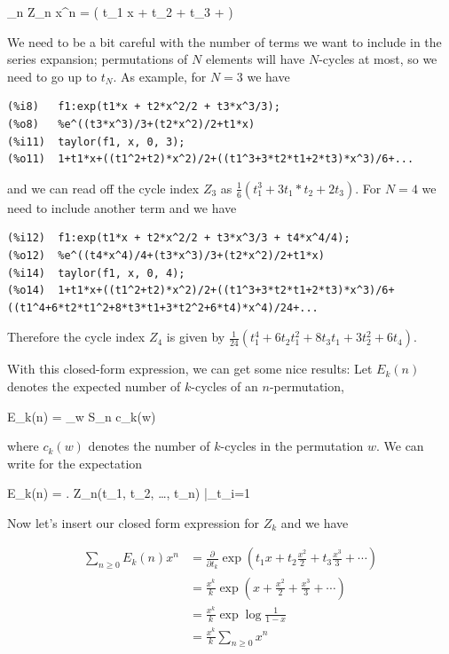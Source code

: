 \bee
\sum_n Z_n x^n = \exp \left( t_1 x + t_2  + t_3  + \cdots \right)
\eee

We need to be a bit careful with the number of terms we want to include in the series expansion; permutations of $N$ elements will have $N$-cycles at most, so we need to go up to $t_N$. As example, for $N=3$ we have

\begin{verbatim}
(%i8)	f1:exp(t1*x + t2*x^2/2 + t3*x^3/3);
(%o8)	%e^((t3*x^3)/3+(t2*x^2)/2+t1*x)
(%i11)	taylor(f1, x, 0, 3);
(%o11)	1+t1*x+((t1^2+t2)*x^2)/2+((t1^3+3*t2*t1+2*t3)*x^3)/6+...
\end{verbatim}

and we can read off the cycle index $Z_3$ as $\frac{1}{6}(t_1^3+3t_1*t_2+2t_3)$. For $N=4$ we need to include another term and we have

\begin{verbatim}
(%i12)	f1:exp(t1*x + t2*x^2/2 + t3*x^3/3 + t4*x^4/4);
(%o12)	%e^((t4*x^4)/4+(t3*x^3)/3+(t2*x^2)/2+t1*x)
(%i14)	taylor(f1, x, 0, 4);
(%o14)	1+t1*x+((t1^2+t2)*x^2)/2+((t1^3+3*t2*t1+2*t3)*x^3)/6+((t1^4+6*t2*t1^2+8*t3*t1+3*t2^2+6*t4)*x^4)/24+...
\end{verbatim}

Therefore the cycle index $Z_4$ is given by $\frac{1}{24}( t_1^4+6t_2 t_1^2+ 8 t_3 t_1+ 3 t_2^2+6 t_4  )$.

With this closed-form expression, we can get some nice results: Let $E_k(n)$ denotes the expected number of $k$-cycles of an $n$-permutation,

\bee
E_k(n) =  \sum_{w \in S_n} c_k(w)
\eee

where $c_k(w)$ denotes the number of $k$-cycles in the permutation $w$. We can write for the expectation

\bee
E_k(n) = \left.  Z_n(t_1, t_2, \ldots, t_n) \right|_{t_i=1}
\eee

Now let's insert our closed form expression for $Z_k$ and we have

\begin{align*}
  \sum_{n \geq 0} E_k(n) x^n &= \frac{\partial}{\partial t_k} \exp\left(  t_1 x + t_2 \frac{x^2}{2} + t_3 \frac{x^3}{3} + \cdots \right) \\
                             &= \frac{x^k}{k} \exp\left(  x + \frac{x^2}{2} + \frac{x^3}{3} + \cdots \right) \\
                             &= \frac{x^k}{k} \exp \log \frac{1}{1-x} \\
                             &= \frac{x^k}{k} \sum_{n \geq 0} x^n
\end{align*}

